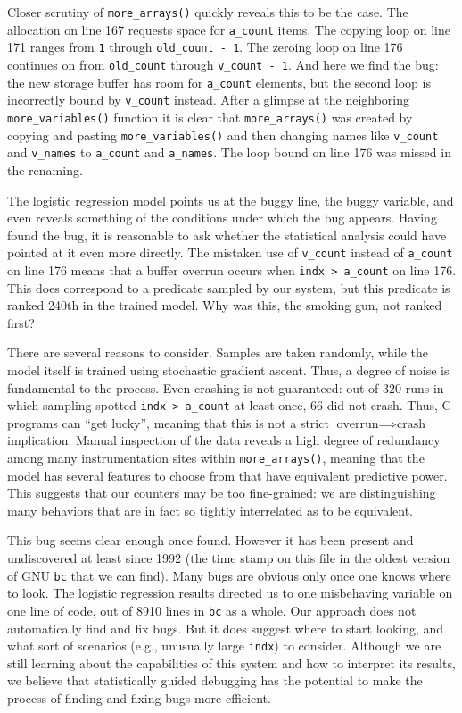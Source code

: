 Closer scrutiny of \texttt{more\_arrays()} quickly reveals this to be
the case.  The allocation on line 167 requests space for
\texttt{a\_count} items.  The copying loop on line 171 ranges from
\texttt{1} through \texttt{old\_count - 1}.  The zeroing loop on line
176 continues on from \texttt{old\_count} through \texttt{v\_count -
  1}.  And here we find the bug: the new storage buffer has room for
\texttt{a\_count} elements, but the second loop is incorrectly bound
by \texttt{v\_count} instead.  After a glimpse at the
neighboring \texttt{more\_variables()} function it is clear that
\texttt{more\_arrays()} was created by copying and pasting
\texttt{more\_variables()} and then changing names like
\texttt{v\_count} and \texttt{v\_names} to \texttt{a\_count} and
\texttt{a\_names}.  The loop bound on line 176 was missed in the
renaming.

The logistic regression model points us at the buggy line, the buggy
variable, and even reveals something of the conditions under which the
bug appears.  Having found the bug, it is reasonable to ask
whether the statistical analysis could have pointed at it even more
directly.  The mistaken use of \texttt{v\_count} instead of
\texttt{a\_count} on line 176 means that a buffer overrun occurs when
\texttt{indx > a\_count} on line 176.  This does correspond to a
predicate sampled by our system, but this predicate is ranked 240th in
the trained model.  Why was this, the smoking gun, not ranked first?

There are several reasons to consider.  Samples are taken randomly,
while the model itself is trained using stochastic gradient ascent.
Thus, a degree of noise is fundamental to the process.  Even crashing
is not guaranteed: out of 320 runs in which sampling spotted
\texttt{indx > a\_count} at least once, 66 did not crash.  Thus, C
programs can ``get lucky'', meaning that this is not a strict
$\text{overrun} \implies \text{crash}$ implication.  Manual inspection
of the data reveals a high degree of redundancy among many
instrumentation sites within \texttt{more\_arrays()}, meaning that the
model has several features to choose from that have equivalent
predictive power.  This suggests that our counters may be too
fine-grained: we are distinguishing many behaviors that are in
fact so tightly interrelated as to be equivalent.  

This bug seems clear enough once found.  However it has been present
and undiscovered at least since 1992 (the time stamp on this file in
the oldest version of GNU \texttt{bc} that we can find).  Many bugs
are obvious only once one knows where to look.  The logistic
regression results directed us to one misbehaving variable on one line
of code, out of 8910 lines in \texttt{bc} as a whole.  Our approach
does not automatically find and fix bugs.  But it does suggest where
to start looking, and what sort of scenarios (e.g., unusually large
\texttt{indx}) to consider.  Although we are still learning about the
capabilities of this system and how to interpret its results, we
believe that statistically guided debugging has the potential to make
the process of finding and fixing bugs more efficient.

